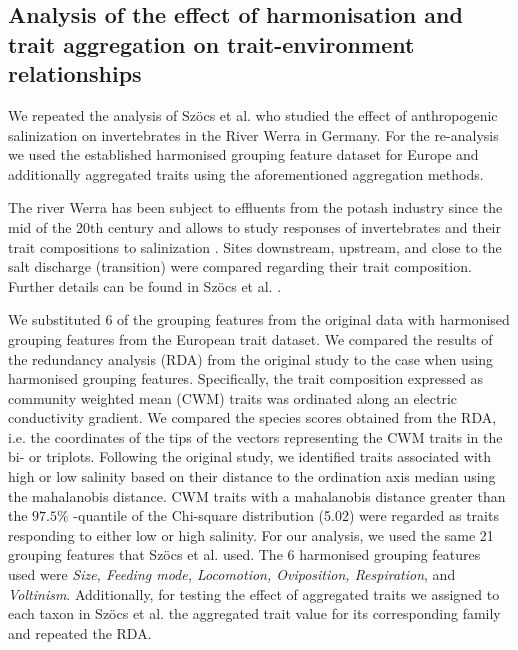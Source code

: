 \documentclass{article}
\begin{document}
\subsection*{Analysis of the effect of harmonisation and trait aggregation on trait-environment relationships}

We repeated the analysis of Szöcs et al. \cite{szocs_effects_2014} who studied the effect of anthropogenic salinization on invertebrates in the River Werra in Germany. For the re-analysis we used the established harmonised grouping feature dataset for Europe and additionally aggregated traits using the aforementioned aggregation methods. 

The river Werra has been subject to effluents from the potash industry since the mid of the 20th century and allows to study responses of invertebrates and their trait compositions to salinization \cite{bathe_biological_2011}. Sites downstream, upstream, and close to the salt discharge (transition) were compared regarding their trait composition. Further details can be found in Szöcs et al. \cite{szocs_effects_2014}. 

We substituted 6 of the grouping features from the original data with harmonised grouping features from the European trait dataset. We compared the results of the redundancy analysis (RDA) from the original study to the case when using harmonised grouping features. Specifically, the trait composition expressed as community weighted mean (CWM) traits was ordinated along an electric conductivity gradient. We compared the species scores obtained from the RDA, i.e. the coordinates of the tips of the vectors representing the CWM traits in the bi- or triplots. Following the original study, we identified traits associated with high or low salinity based on their distance to the ordination axis median using the mahalanobis distance. CWM traits with a mahalanobis distance greater than the $97.5 \%$ -quantile of the Chi-square distribution (5.02) were regarded as traits responding to either low or high salinity. For our analysis, we used the same 21 grouping features that Szöcs et al. \cite{szocs_effects_2014} used. The 6 harmonised grouping features used were \textit{Size, Feeding mode, Locomotion, Oviposition, Respiration}, and \textit{Voltinism}. Additionally, for testing the effect of aggregated traits we assigned to each taxon in Szöcs et al. \cite{szocs_effects_2014} the aggregated trait value for its corresponding family and repeated the RDA.  

\end{document}
